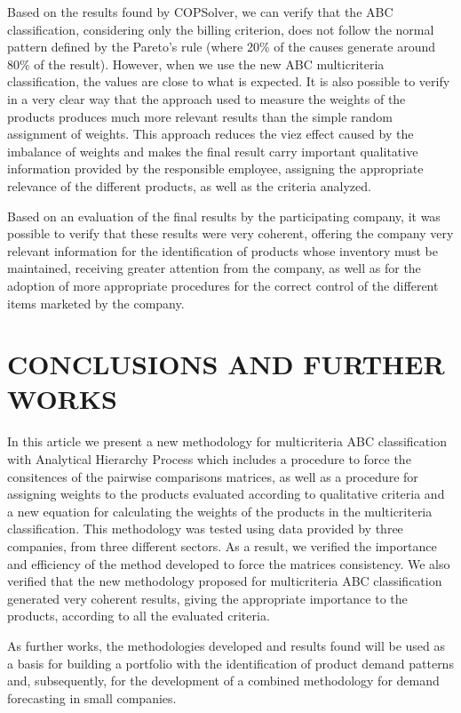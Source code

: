 \documentclass[10pt,fleqn,a4paper,twoside]{article}
\begin{document}
Based on the results found by COPSolver, we can verify that the ABC classification, considering only the billing criterion, does not follow the normal pattern defined by the Pareto's rule (where 20\% of the causes generate around 80\% of the result). However, when we use the new ABC multicriteria classification, the values are close to what is expected. It is also possible to verify in a very clear way that the approach used to measure the weights of the products produces much more relevant results than the simple random assignment of weights. This approach reduces the viez effect caused by the imbalance of weights and makes the final result carry important qualitative information provided by the responsible employee, assigning the appropriate relevance of the different products, as well as the criteria analyzed.

Based on an evaluation of the final results by the participating company, it was possible to verify that these results were very coherent, offering the company very relevant information for the identification of products whose inventory must be maintained, receiving greater attention from the company, as well as for the adoption of more appropriate procedures for the correct control of the different items marketed by the company.

	\section{CONCLUSIONS AND FURTHER WORKS}
    
    In this article we present a new methodology for multicriteria ABC classification with Analytical Hierarchy Process which includes a procedure to force the consitences of the pairwise comparisons matrices, as well as a procedure for assigning weights to the products evaluated according to qualitative criteria and a new equation for calculating the weights of the products in the multicriteria classification. This methodology was tested using data provided by three companies, from three different sectors. As a result, we verified the importance and efficiency of the method developed to force the matrices consistency. We also verified that the new methodology proposed for multicriteria ABC classification generated very coherent results, giving the appropriate importance to the products, according to all the evaluated criteria. 

As further works, the methodologies developed and results found will be used as a basis for building a portfolio with the identification of product demand patterns and, subsequently, for the development of a combined methodology for demand forecasting in small companies. 
\end{document}
